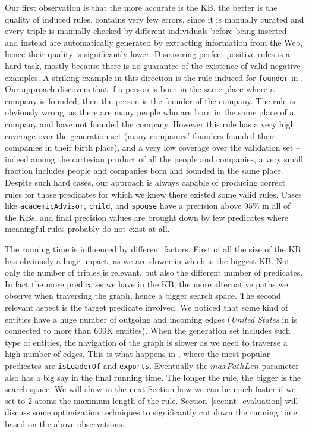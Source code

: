 Our first observation is that the more accurate is the KB, the better is the quality of induced rules. \wikidata contains very few errors, since it is manually curated and every triple is manually checked by different individuals before being inserted. \dbpedia and \yago instead are automatically generated by extracting information from the Web, hence their quality is significantly lower. Discovering perfect positive rules is a hard task, mostly because there is no guarantee of the existence of valid negative examples. A striking example in this direction is the rule induced for \texttt{founder} in \dbpedia. Our approach discovers that if a person is born in the same place where a company is founded, then the person is the founder of the company. The rule is obviously wrong, as there are many people who are born in the same place of a company and have not founded the company. However this rule has a very high coverage over the generation set (many companies' founders founded their companies in their birth place), and a very low coverage over the validation set -- indeed among the cartesian product of all the people and companies, a very small fraction includes people and companies born and founded in the same place. Despite such hard cases, our approach is always capable of producing correct rules for those predicates for which we knew there existed some valid rules. Cases like \texttt{academicAdvisor}, \texttt{child}, and \texttt{spouse} have a precision above $95\%$ in all of the KBs, and final precision values are brought down by few predicates where meaningful rules probably do not exist at all.

The running time is influenced by different factors. First of all the size of the KB has obviously a huge impact, as we are slower in \wikidata which is the biggest KB. Not only the number of triples is relevant, but also the different number of predicates. In fact the more predicates we have in the KB, the more alternative paths we observe when traversing the graph, hence a bigger search space. The second relevant aspect is the target predicate involved. We noticed that some kind of entities have a huge number of outgoing and incoming edges (\textit{United States} in \wikidata is connected to more than 600K entities). When the generation set includes such type of entities, the navigation of the graph is slower as we need to traverse a high number of edges. This is what happens in \yago, where the most popular predicates are \texttt{isLeaderOf} and \texttt{exports}. Eventually the $maxPathLen$ parameter also has a big say in the final running time. The longer the rule, the bigger is the search space. We will show in the next Section how we can be much faster if we set to 2 atoms the maximum length of the rule. Section~\ref{sec:int_evaluation} will discuss some optimization techniques to significantly cut down 	the running time based on the above observations.

